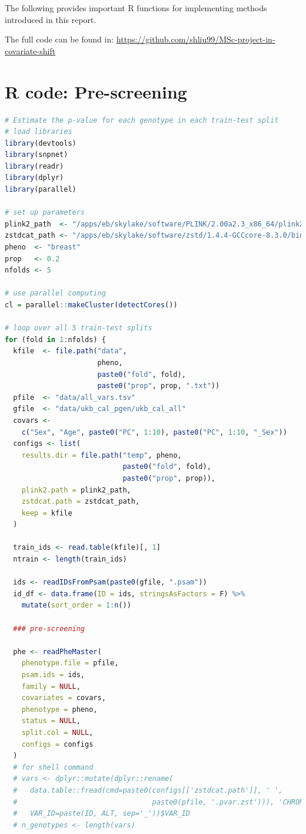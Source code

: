 \documentclass[a4paper,12pt]{article}
\begin{document}
\appendix
\begin{appendices}
The following provides important R functions for implementing methods introduced in this report. 

The full code can be found in: \url{https://github.com/shliu99/MSc-project-in-covariate-shift}
\section{R code: Pre-screening} \label{Appendix A}
\begin{lstlisting}[language=R]
# Estimate the p-value for each genotype in each train-test split
# load libraries
library(devtools)
library(snpnet)
library(readr)
library(dplyr)
library(parallel)

# set up parameters 
plink2_path  <- "/apps/eb/skylake/software/PLINK/2.00a2.3_x86_64/plink2"
zstdcat_path <- "/apps/eb/skylake/software/zstd/1.4.4-GCCcore-8.3.0/bin/zstdcat"
pheno  <- "breast"
prop   <- 0.2
nfolds <- 5

# use parallel computing
cl = parallel::makeCluster(detectCores())

# loop over all 5 train-test splits
for (fold in 1:nfolds) {
  kfile  <- file.path("data",
                      pheno,
                      paste0("fold", fold),
                      paste0("prop", prop, ".txt"))
  pfile  <- "data/all_vars.tsv"
  gfile  <- "data/ukb_cal_pgen/ukb_cal_all"
  covars <-
    c("Sex", "Age", paste0("PC", 1:10), paste0("PC", 1:10, "_Sex"))
  configs <- list(
    results.dir = file.path("temp", pheno,
                            paste0("fold", fold),
                            paste0("prop", prop)),
    plink2.path = plink2_path,
    zstdcat.path = zstdcat_path,
    keep = kfile
  )
  
  train_ids <- read.table(kfile)[, 1]
  ntrain <- length(train_ids)
  
  ids <- readIDsFromPsam(paste0(gfile, ".psam"))
  id_df <- data.frame(ID = ids, stringsAsFactors = F) %>%
    mutate(sort_order = 1:n())
  
  ### pre-screening
  
  phe <- readPheMaster(
    phenotype.file = pfile,
    psam.ids = ids,
    family = NULL,
    covariates = covars,
    phenotype = pheno,
    status = NULL,
    split.col = NULL,
    configs = configs
  ) 
  # for shell command
  # vars <- dplyr::mutate(dplyr::rename(
  #   data.table::fread(cmd=paste0(configs[['zstdcat.path']], ' ',
  #                                paste0(pfile, '.pvar.zst'))), 'CHROM'='#CHROM'),
  #   VAR_ID=paste(ID, ALT, sep='_'))$VAR_ID
  # n_genotypes <- length(vars)
  

\end{lstlisting}
\end{appendices}
\end{document}
